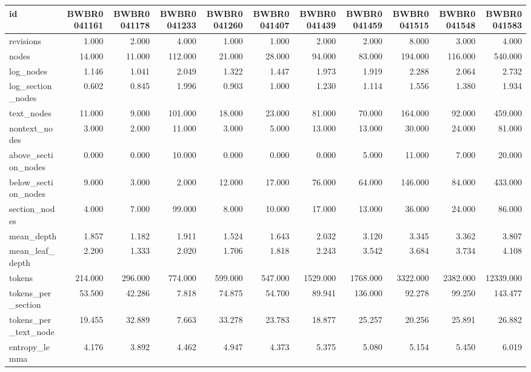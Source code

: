 \begin{tabular}{lrrrrrrrrrr}
\toprule
id & BWBR0041161 & BWBR0041178 & BWBR0041233 & BWBR0041260 & BWBR0041407 & BWBR0041439 & BWBR0041459 & BWBR0041515 & BWBR0041548 & BWBR0041583 \\
\midrule
revisions & 1.000 & 2.000 & 4.000 & 1.000 & 1.000 & 2.000 & 2.000 & 8.000 & 3.000 & 4.000 \\
\cline{1-11}
nodes & 14.000 & 11.000 & 112.000 & 21.000 & 28.000 & 94.000 & 83.000 & 194.000 & 116.000 & 540.000 \\
\cline{1-11}
log\_nodes & 1.146 & 1.041 & 2.049 & 1.322 & 1.447 & 1.973 & 1.919 & 2.288 & 2.064 & 2.732 \\
\cline{1-11}
log\_section\_nodes & 0.602 & 0.845 & 1.996 & 0.903 & 1.000 & 1.230 & 1.114 & 1.556 & 1.380 & 1.934 \\
\cline{1-11}
text\_nodes & 11.000 & 9.000 & 101.000 & 18.000 & 23.000 & 81.000 & 70.000 & 164.000 & 92.000 & 459.000 \\
\cline{1-11}
nontext\_nodes & 3.000 & 2.000 & 11.000 & 3.000 & 5.000 & 13.000 & 13.000 & 30.000 & 24.000 & 81.000 \\
\cline{1-11}
above\_section\_nodes & 0.000 & 0.000 & 10.000 & 0.000 & 0.000 & 0.000 & 5.000 & 11.000 & 7.000 & 20.000 \\
\cline{1-11}
below\_section\_nodes & 9.000 & 3.000 & 2.000 & 12.000 & 17.000 & 76.000 & 64.000 & 146.000 & 84.000 & 433.000 \\
\cline{1-11}
section\_nodes & 4.000 & 7.000 & 99.000 & 8.000 & 10.000 & 17.000 & 13.000 & 36.000 & 24.000 & 86.000 \\
\cline{1-11}
mean\_depth & 1.857 & 1.182 & 1.911 & 1.524 & 1.643 & 2.032 & 3.120 & 3.345 & 3.362 & 3.807 \\
\cline{1-11}
mean\_leaf\_depth & 2.200 & 1.333 & 2.020 & 1.706 & 1.818 & 2.243 & 3.542 & 3.684 & 3.734 & 4.108 \\
\cline{1-11}
tokens & 214.000 & 296.000 & 774.000 & 599.000 & 547.000 & 1529.000 & 1768.000 & 3322.000 & 2382.000 & 12339.000 \\
\cline{1-11}
tokens\_per\_section & 53.500 & 42.286 & 7.818 & 74.875 & 54.700 & 89.941 & 136.000 & 92.278 & 99.250 & 143.477 \\
\cline{1-11}
tokens\_per\_text\_node & 19.455 & 32.889 & 7.663 & 33.278 & 23.783 & 18.877 & 25.257 & 20.256 & 25.891 & 26.882 \\
\cline{1-11}
entropy\_lemma & 4.176 & 3.892 & 4.462 & 4.947 & 4.373 & 5.375 & 5.080 & 5.154 & 5.450 & 6.019 \\

\end{tabular}

